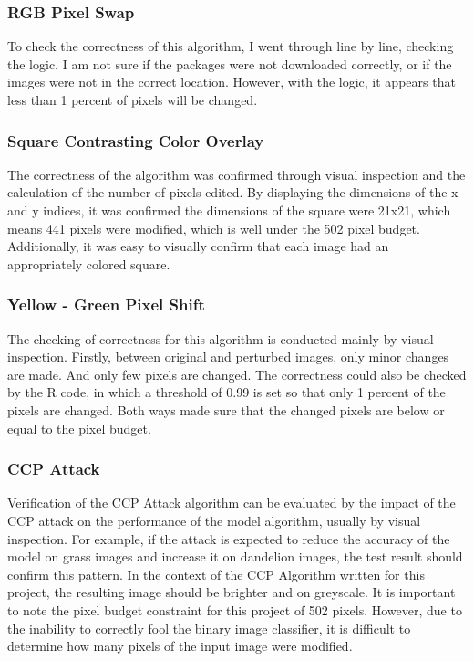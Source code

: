 \documentclass{article}
\begin{document}
\subsubsection{RGB Pixel Swap}
To check the correctness of this algorithm, I went through line by line, checking the logic. I am not sure if the packages were not downloaded correctly, or if the images were not in the correct location. However, with the logic, it appears that less than 1 percent of pixels will be changed.  
\subsubsection{Square Contrasting Color Overlay}
The correctness of the algorithm was confirmed through visual inspection and the calculation of the number of pixels edited. By displaying the dimensions of the x and y indices, it was confirmed the dimensions of the square were 21x21, which means 441 pixels were modified, which is well under the 502 pixel budget. Additionally, it was easy to visually confirm that each image had an appropriately colored square.
\subsubsection{Yellow - Green Pixel Shift}
The checking of correctness for this algorithm is conducted mainly by visual inspection. Firstly, between original and perturbed images, only minor changes are made. And only few pixels are changed. The correctness could also be checked by the R code, in which a threshold of 0.99 is set so that only 1 percent of the pixels are changed. Both ways made sure that the changed pixels are below or equal to the pixel budget.   

\subsubsection{CCP Attack}
Verification of the CCP Attack algorithm can be evaluated by the impact of the CCP attack on the performance of the model algorithm, usually by visual inspection. For example, if the attack is expected to reduce the accuracy of the model on grass images and increase it on dandelion images, the test result should confirm this pattern. In the context of the CCP Algorithm written for this project, the resulting image should be brighter and on greyscale. It is important to note the pixel budget constraint for this project of 502 pixels. However, due to the inability to correctly fool the binary image classifier, it is difficult to determine how many pixels of the input image were modified. 
\end{document}
